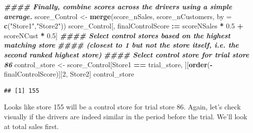 \documentclass[
]{article}
\newenvironment{Shaded}{\begin{snugshade}}{\end{snugshade}}
\newcommand{\AttributeTok}[1]{\textcolor[rgb]{0.13,0.29,0.53}{#1}}
\newcommand{\DecValTok}[1]{\textcolor[rgb]{0.00,0.00,0.81}{#1}}
\newcommand{\DocumentationTok}[1]{\textcolor[rgb]{0.56,0.35,0.01}{\textbf{\textit{#1}}}}
\newcommand{\FloatTok}[1]{\textcolor[rgb]{0.00,0.00,0.81}{#1}}
\newcommand{\FunctionTok}[1]{\textcolor[rgb]{0.13,0.29,0.53}{\textbf{#1}}}
\newcommand{\NormalTok}[1]{#1}
\newcommand{\OtherTok}[1]{\textcolor[rgb]{0.56,0.35,0.01}{#1}}
\newcommand{\SpecialCharTok}[1]{\textcolor[rgb]{0.81,0.36,0.00}{\textbf{#1}}}
\newcommand{\StringTok}[1]{\textcolor[rgb]{0.31,0.60,0.02}{#1}}
\begin{document}
\begin{Shaded}
\begin{Highlighting}[]
\DocumentationTok{\#\#\#\# Finally, combine scores across the drivers using a simple average.}
\NormalTok{score\_Control }\OtherTok{\textless{}{-}} \FunctionTok{merge}\NormalTok{(score\_nSales, score\_nCustomers, }\AttributeTok{by =} \FunctionTok{c}\NormalTok{(}\StringTok{"Store1"}\NormalTok{,}\StringTok{"Store2"}\NormalTok{))}
\NormalTok{score\_Control[, finalControlScore }\SpecialCharTok{:=}\NormalTok{ scoreNSales }\SpecialCharTok{*} \FloatTok{0.5} \SpecialCharTok{+}\NormalTok{ scoreNCust }\SpecialCharTok{*} \FloatTok{0.5}\NormalTok{]}
\DocumentationTok{\#\#\#\# Select control stores based on the highest matching store}
\DocumentationTok{\#\#\#\# (closest to 1 but not the store itself, i.e. the second ranked highest store)}
\DocumentationTok{\#\#\#\# Select control store for trial store 86}
\NormalTok{control\_store }\OtherTok{\textless{}{-}}\NormalTok{ score\_Control[Store1 }\SpecialCharTok{==}\NormalTok{ trial\_store,}
\NormalTok{][}\FunctionTok{order}\NormalTok{(}\SpecialCharTok{{-}}\NormalTok{finalControlScore)][}\DecValTok{2}\NormalTok{, Store2]}
\NormalTok{control\_store}
\end{Highlighting}
\end{Shaded}

\begin{verbatim}
## [1] 155
\end{verbatim}

Looks like store 155 will be a control store for trial store 86. Again,
let's check visually if the drivers are indeed similar in the period
before the trial. We'll look at total sales first.
\end{document}
